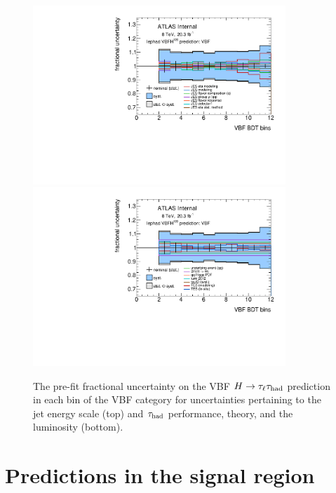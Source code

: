 \begin{figure}[tp]
  \includegraphics[width=0.85\textwidth]{figures/uncertainties/uncertainties_lephad_paper14_8TeV_VBFH125_JES_VBF}
  \includegraphics[width=0.85\textwidth]{figures/uncertainties/uncertainties_lephad_paper14_8TeV_VBFH125_other_VBF}
  \caption{The pre-fit fractional uncertainty on the VBF $H\rightarrow\tau_\ell\tau_\text{had}$ prediction in each bin of the VBF category for uncertainties pertaining to the jet energy scale (top) and $\tau_\text{had}$ performance, theory, and the luminosity (bottom).}
  \label{fig:backgrounds-uncertainties-vbf}
\end{figure}

\section{Predictions in the signal region}
\label{sec:results-prefit}

\clearpage

